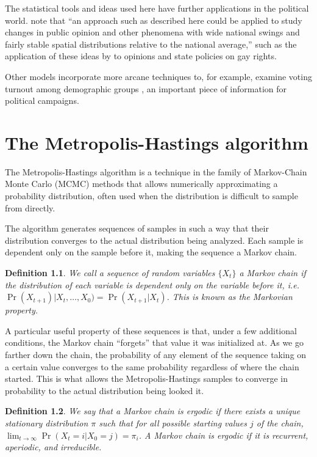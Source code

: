 \documentclass[12pt]{report}
\newtheorem{definition}{Definition}[chapter]
\begin{document}
The statistical tools and ideas used here have further applications in the political world. \citet{Lock:2010aa} note that ``an approach such as described here could be applied to study changes in public opinion and other phenomena with wide national swings and fairly stable spatial distributions relative to the national average,'' such as the application of these ideas by \citet{Lax:2009aa} to opinions and state policies on gay rights.

Other models incorporate more arcane techniques to, for example, examine voting turnout among demographic groups \citep{Ghitza:2013aa}, an important piece of information for political campaigns.

\setcounter{chapter}{7}
\chapter{The Metropolis-Hastings algorithm}

The Metropolis-Hastings algorithm is a technique in the family of Markov-Chain Monte Carlo (MCMC) methods that allows numerically approximating a probability distribution, often used when the distribution is difficult to sample from directly.

The algorithm generates sequences of samples in such a way that their distribution converges to the actual distribution being analyzed. Each sample is dependent only on the sample before it, making the sequence a Markov chain.

\begin{definition} We call a sequence of random variables $\{X_t\}$ a Markov chain if the distribution of each variable is dependent only on the variable before it, i.e. \( \Pr(X_{t+1}) | X_t,\ldots,X_0) = \Pr(X_{t+1}|X_t) \). This is known as the Markovian property. \end{definition}

A particular useful property of these sequences is that, under a few additional conditions, the Markov chain ``forgets'' that value it was initialized at. As we go farther down the chain, the probability of any element of the sequence taking on a certain value converges to the same probability regardless of where the chain started. This is what allows the Metropolis-Hastings samples to converge in probability to the actual distribution being looked it.

\begin{definition}
We say that a Markov chain is ergodic if there exists a unique stationary distribution $\pi$ such that for all possible starting values $j$ of the chain, $\lim_{t\to \infty} \Pr(X_t = i | X_0 = j) = \pi_i$. A Markov chain is ergodic if it is recurrent, aperiodic, and irreducible.
\end{definition} 
\end{document}
